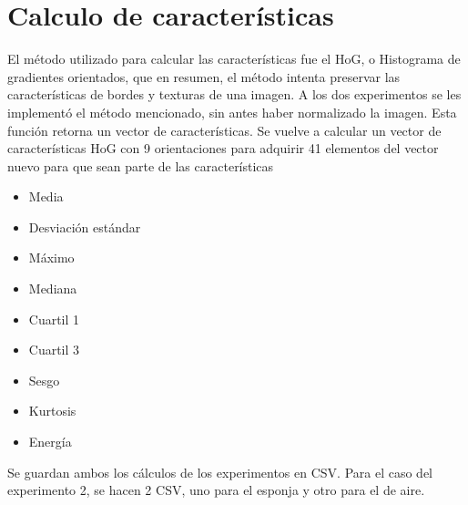 \documentclass[12pt,a4paper]{report}
\begin{document}
\section{Calculo de características}
El método utilizado para calcular las características fue el HoG, o Histograma de gradientes orientados, que en resumen, el método intenta preservar las características de bordes y texturas de una imagen.
A los dos experimentos se les implementó el método mencionado, sin antes haber normalizado la imagen. Esta función retorna un vector de características. Se vuelve a calcular un vector de características HoG con 9 orientaciones para adquirir 41 elementos del vector nuevo para que sean parte de las características 
\begin{itemize}
    \item Media
    \item Desviación estándar
    \item Máximo
    \item Mediana
    \item Cuartil 1 
    \item Cuartil 3
    \item Sesgo
    \item Kurtosis
    \item Energía 
\end{itemize}
Se guardan ambos los cálculos de los experimentos en CSV. Para el caso del experimento 2, se hacen 2 CSV, uno para el esponja y otro para el de aire.
\end{document}
